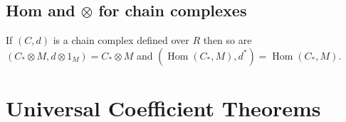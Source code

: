 \documentclass[10pt,]{book}
\theoremstyle{plain}
\theoremstyle{definition}
\numberwithin{equation}{section}
\DeclareMathOperator{\Hom}{Hom}
\begin{document}
\subsection[Hom and \(\otimes\) for chain complexes]{Hom and \(\otimes\) for chain complexes}\label{subsection-10}
If \((C, d)\) is a chain complex defined over \(R\) then so are \((C_*\otimes M, d\otimes 1_M) = C_* \otimes M\) and \((\Hom(C_*,M),d^*) = \Hom(C_*, M)\).%
\typeout{************************************************}
\typeout{************************************************}
\section[Universal Coefficient Theorems]{Universal Coefficient Theorems}\label{section-9}
\typeout{************************************************}
\typeout{************************************************}
\end{document}
